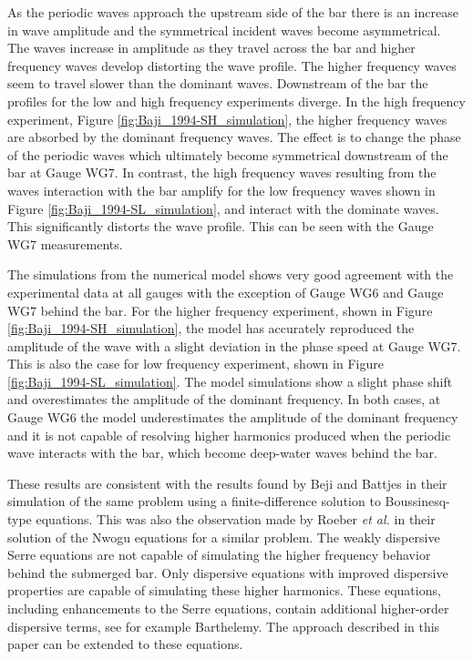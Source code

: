 \documentclass[preprint,sort&compress,1p]{article}
\begin{document}
As the periodic waves approach the upstream side of the bar there is an increase in wave amplitude and the symmetrical incident waves become asymmetrical. The waves increase in amplitude as they travel across the bar and higher frequency waves develop distorting the wave profile. The higher frequency waves seem to travel slower than the dominant waves. Downstream of the bar the profiles for the low and high frequency experiments diverge. In the high frequency experiment, Figure \ref{fig:Baji_1994-SH_simulation}, the higher frequency waves are absorbed by the dominant frequency waves. The effect is to change the phase of the periodic waves which ultimately become symmetrical downstream of the bar at Gauge WG7. In contrast, the high frequency waves resulting from the waves interaction with the bar amplify for the low frequency waves shown in Figure \ref{fig:Baji_1994-SL_simulation}, and interact with the dominate waves. This significantly distorts the wave profile. This can be seen with the Gauge WG7 measurements.

The simulations from the numerical model shows very good agreement with the experimental data at all gauges with the exception of Gauge WG6 and Gauge WG7 behind the bar. For the higher frequency experiment, shown in Figure \ref{fig:Baji_1994-SH_simulation}, the model has accurately reproduced the amplitude of the wave with a slight deviation in the phase speed at Gauge WG7. This is also the case for low frequency experiment, shown in Figure \ref{fig:Baji_1994-SL_simulation}. The model simulations show a slight phase shift and overestimates the amplitude of the dominant frequency. In both cases, at Gauge WG6 the model underestimates the amplitude of the dominant frequency and it is not capable of resolving higher harmonics produced when the periodic wave interacts with the bar, which become deep-water waves behind the bar\cite{Lannes-D-2013}.

These results are consistent with the results found by Beji and Battjes\cite{Batji-Battjes-1994-1} in their simulation of the same problem using a finite-difference solution to Boussinesq-type equations. This was also the observation made by Roeber \emph{et al.}\cite{Roeber-etal-2010-407} in their  solution of the Nwogu\cite{Nwogu-O-1993-618} equations  for a similar problem. The weakly dispersive Serre equations are not capable of simulating the higher frequency behavior behind the submerged bar.  Only dispersive equations with improved dispersive properties are capable of simulating these higher harmonics\cite{Lannes-D-2013}. These equations, including enhancements to the Serre equations, contain additional higher-order dispersive terms, see for example Barthelemy\cite{Barthelemy-E-2004-315}. The approach described in this paper can be extended to these equations.
\end{document}
